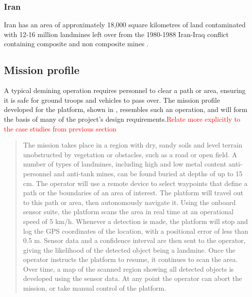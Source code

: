 \documentclass[main.tex]{subfiles}
\begin{document}
 \subsubsection{Iran}
Iran has an area of approximately 18,000 square kilometres of land contaminated with 12-16 million landmines left over from the 1980-1988 Iran-Iraq conflict containing composite and non composite mines \parencite{landmineMonitor2015}. %



\subsection{Mission profile}
A typical demining operation requires personnel to clear a path or area, ensuring it is safe for ground troops and vehicles to pass over. The mission profile developed for the platform, shown in , resembles such an operation, and will form the basis of many of the project's design requirements.\textcolor{red}{Relate more explicitly to the case studies from previous section}
\begin{quote}The mission takes place in a region with dry, sandy soils and level terrain unobstructed by vegetation or obstacles, such as a road or open field. A number of types of landmines, including high and low metal content anti-personnel and anti-tank mines, can be found buried at depths of up to 15 cm. The operator will use a remote device to select waypoints that define a path or the boundaries of an area of interest. The platform will travel out to this path or area, then autonomously navigate it. Using the onboard sensor suite, the platform scans the area in real time at an operational speed of 5 km/h. Whenever a detection is made, the platform will stop and log the GPS coordinates of the location, with a positional error of less than 0.5 m. Sensor data and a confidence interval are then sent to the operator, giving the likelihood of the detected object being a landmine. Once the operator instructs the platform to resume, it continues to scan the area. Over time, a map of the scanned region showing all detected objects is developed using the sensor data. At any point the operator can abort the mission, or take manual control of the platform.
\end{quote}
\end{document}
